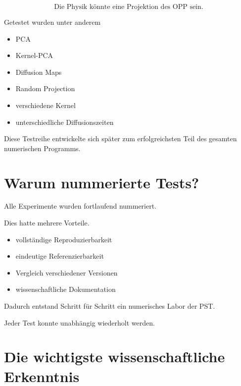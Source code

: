 \[
\boxed{
\text{Die Physik könnte eine Projektion des OPP sein.}
}
\]

Getestet wurden unter anderem

\begin{itemize}

\item PCA

\item Kernel-PCA

\item Diffusion Maps

\item Random Projection

\item verschiedene Kernel

\item unterschiedliche Diffusionszeiten

\end{itemize}

Diese Testreihe entwickelte sich später zum erfolgreichsten Teil des gesamten numerischen Programms.


\section*{Warum nummerierte Tests?}

Alle Experimente wurden fortlaufend nummeriert.

Dies hatte mehrere Vorteile.

\begin{itemize}

\item vollständige Reproduzierbarkeit

\item eindeutige Referenzierbarkeit

\item Vergleich verschiedener Versionen

\item wissenschaftliche Dokumentation

\end{itemize}

Dadurch entstand Schritt für Schritt ein numerisches Labor der PST.

Jeder Test konnte unabhängig wiederholt werden.


\section*{Die wichtigste wissenschaftliche Erkenntnis}


